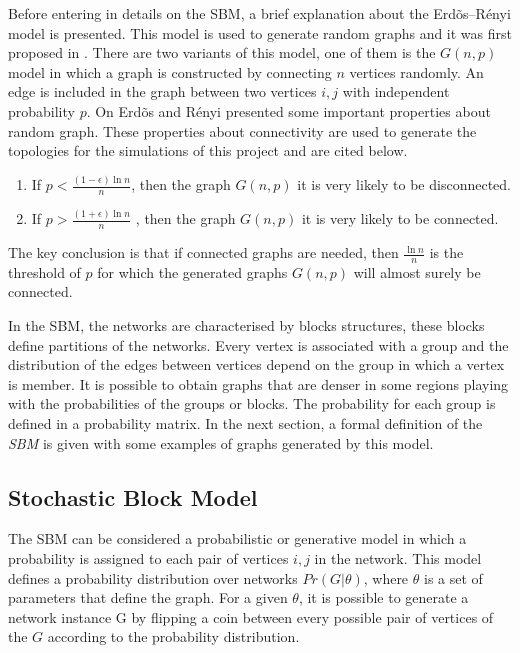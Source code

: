 Before entering in details on the SBM, a brief explanation about the Erd\~os--R\'enyi model is presented. This model is used to generate random graphs and it was first proposed in \cite{erdds1959random}. There are two variants of this model, one of them is the $G(n, p)$ model in which a graph is constructed by connecting $n$ vertices randomly. An edge is included in the graph between two vertices $i,j$ with independent probability $p$. On \cite{erdos1960evolution} Erd\~os and R\'enyi presented some important properties about random graph. These properties about connectivity are used to generate the topologies for the simulations of this project and are cited below.


\begin{enumerate}
\item If $p<{\tfrac {(1-\epsilon )\ln n}{n}}$, then the graph $G(n, p)$ it is very likely to be disconnected.
\item If $p>{\tfrac {(1+\epsilon )\ln n}{n}}$ , then the graph $G(n, p)$ it is very likely to be connected.
\end{enumerate}

The key conclusion is that if connected graphs are needed, then ${\tfrac {\ln n}{n}}$ is the threshold of $p$ for which the generated graphs $G(n, p)$ will almost surely be connected.  

In the SBM, the networks are characterised by blocks structures, these blocks define partitions of the networks. Every vertex is associated with a group and the distribution of the edges between vertices depend on the group in which a vertex is member. It is possible to obtain graphs that are denser in some regions playing with the probabilities of the groups or blocks. The probability for each group is defined in a probability matrix. In the next section, a formal definition of the \textit{SBM} is given with some examples of graphs generated by this model.


\subsection{Stochastic Block Model}

The SBM can be considered a probabilistic or generative model in which a probability is assigned to each pair of vertices $i,j$ in the network. This model defines a probability distribution over networks $Pr(G | \theta)$, where $\theta$ is a set of parameters that define the graph. For a given $\theta$, it is possible to generate a network instance G by flipping a coin between every possible pair of vertices of the $G$ according to the probability distribution.  

